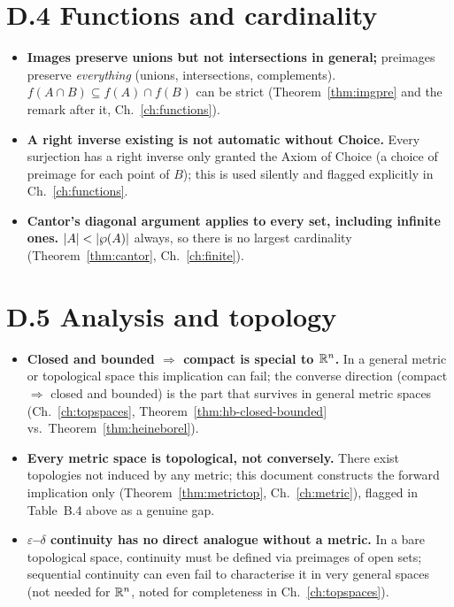 \section*{D.4 Functions and cardinality}

\begin{itemize}
	\item \textbf{Images preserve unions but not intersections in general;} preimages preserve \emph{everything} (unions, intersections, complements). $f(A\cap B)\subseteq f(A)\cap f(B)$ can be strict (Theorem~\ref{thm:imgpre} and the remark after it, Ch.~\ref{ch:functions}).
	\item \textbf{A right inverse existing is not automatic without Choice.} Every surjection has a right inverse only granted the Axiom of Choice (a choice of preimage for each point of $B$); this is used silently and flagged explicitly in Ch.~\ref{ch:functions}.
	\item \textbf{Cantor's diagonal argument applies to every set, including infinite ones.} $|A|<|\pset(A)|$ always, so there is no largest cardinality (Theorem~\ref{thm:cantor}, Ch.~\ref{ch:finite}).
\end{itemize}

\section*{D.5 Analysis and topology}

\begin{itemize}
	\item \textbf{Closed and bounded $\Rightarrow$ compact is special to $\mathbb{R}^n$.} In a general metric or topological space this implication can fail; the converse direction (compact $\Rightarrow$ closed and bounded) is the part that survives in general metric spaces (Ch.~\ref{ch:topspaces}, Theorem~\ref{thm:hb-closed-bounded} vs.\ Theorem~\ref{thm:heineborel}).
	\item \textbf{Every metric space is topological, not conversely.} There exist topologies not induced by any metric; this document constructs the forward implication only (Theorem~\ref{thm:metrictop}, Ch.~\ref{ch:metric}), flagged in Table~B.4 above as a genuine gap.
	\item \textbf{$\varepsilon$--$\delta$ continuity has no direct analogue without a metric.} In a bare topological space, continuity must be defined via preimages of open sets; sequential continuity can even fail to characterise it in very general spaces (not needed for $\mathbb{R}^n$, noted for completeness in Ch.~\ref{ch:topspaces}).
\end{itemize}
